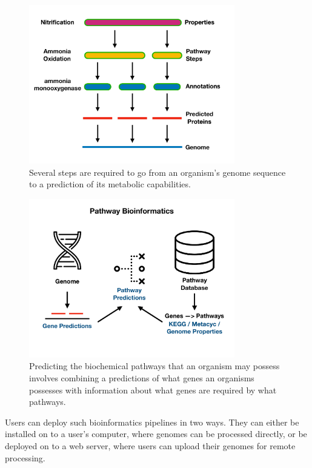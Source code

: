\begin{figure}[!ht]
  \centering
	\includegraphics[width=0.8\textwidth]{media/pathway_analysis_steps.pdf}
	 \caption{Several steps are required to go from an organism's genome sequence to a prediction of its metabolic capabilities.}
	 \label{fig:pathway-analysis-steps}
\end{figure}

\begin{figure}[!ht]
  \centering
	\includegraphics[width=0.8\textwidth]{media/pathway_bioinformatics.pdf}
	 \caption{Predicting the biochemical pathways that an organism may possess involves combining a predictions of what genes an organisms possesses with information about what genes are required by what pathways.}
	 \label{fig:pathway-analysis-overview}
\end{figure}

Users can deploy such bioinformatics pipelines in two ways. They can either be installed on to a user's computer, where genomes can be processed directly, or be deployed on to a web server, where users can upload their genomes for remote processing.

